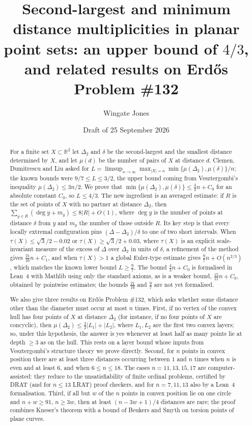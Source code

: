 \documentclass[11pt]{amsart}
\title[Second-largest and minimum distance multiplicities]{Second-largest and minimum distance multiplicities in planar point sets: an upper bound of $4/3$, and related results on Erd\H{o}s Problem \#132}
\author{Wingate Jones}
\date{Draft of 25 September 2026}
\theoremstyle{definition}
\theoremstyle{remark}
\newcommand{\R}{\mathbb{R}}
\newcommand{\Dt}{\Delta_2}
\newcommand{\mult}{\mu}
\begin{document}
\begin{abstract}
For a finite set $X\subset\R^2$ let $\Dt$ and $\delta$ be the second-largest and the smallest distance determined by $X$, and let $\mult(d)$ be the number of pairs of $X$ at distance $d$. Clemen, Dumitrescu and Liu asked for
$L=\limsup_{n\to\infty}\max_{|X|=n}\min\{\mult(\Dt),\mult(\delta)\}/n$; the known bounds were $9/7\le L\le 3/2$, the upper bound coming from Vesztergombi's inequality $\mult(\Dt)\le 3n/2$. We prove that $\min\{\mult(\Dt),\mult(\delta)\}\le \tfrac43n+C_0$ for an absolute constant $C_0$, so $L\le 4/3$. The new ingredient is an averaged estimate: if $R$ is the set of points of $X$ with no partner at distance $\Dt$, then $\sum_{y\in R}(\deg y+m_y)\le 8|R|+O(1)$, where $\deg y$ is the number of points at distance $\delta$ from $y$ and $m_y$ the number of those outside $R$. Its key step is that every locally extremal configuration pins $(\Delta-\Dt)/\delta$ to one of two short intervals. When $\tau(X)\le\sqrt3/2-0.02$ or $\tau(X)\ge\sqrt3/2+0.03$, where $\tau(X)$ is an explicit scale-invariant measure of the excess of $\Delta$ over $\Dt$ in units of $\delta$, a refinement of the method gives $\tfrac{21}{16}n+C_1$, and when $\tau(X)>1$ a global Euler-type estimate gives $\tfrac97n+O(n^{2/3})$, which matches the known lower bound $L\ge\frac97$. The bound $\tfrac43n+C_0$ is formalised in Lean~4 with Mathlib using only the standard axioms, as is a weaker bound, $\tfrac{15}{11}n+C_0$, obtained by pointwise estimates; the bounds $\tfrac{21}{16}$ and $\tfrac97$ are not yet formalised.

We also give three results on Erd\H{o}s Problem \#132, which asks whether some distance other than the diameter must occur at most $n$ times. First, if no vertex of the convex hull has four points of $X$ at distance $\Dt$ (for instance, if no four points of $X$ are concyclic), then $\mult(\Dt)\le\tfrac32|L_1|+|L_2|$, where $L_1,L_2$ are the first two convex layers; so, under this hypothesis, the answer is yes whenever at least half as many points lie at depth $\ge 3$ as on the hull. This rests on a layer bound whose inputs from Vesztergombi's structure theory we prove directly. Second, for $n$ points in convex position there are at least three distances occurring between $1$ and $n$ times when $n$ is even and at least $6$, and when $6\le n\le18$. The cases $n=11,13,15,17$ are computer-assisted: they reduce to the unsatisfiability of finite ordinal problems, certified by DRAT (and for $n\le13$ LRAT) proof checkers, and for $n=7,11,13$ also by a Lean~4 formalisation. Third, if all but $w$ of the $n$ points in convex position lie on one circle and $n+w\ge91$, $n\ge3w$, then at least $(n-3w+1)/4$ distances are rare; the proof combines Kneser's theorem with a bound of Beukers and Smyth on torsion points of plane curves.
\end{abstract}
\end{document}
